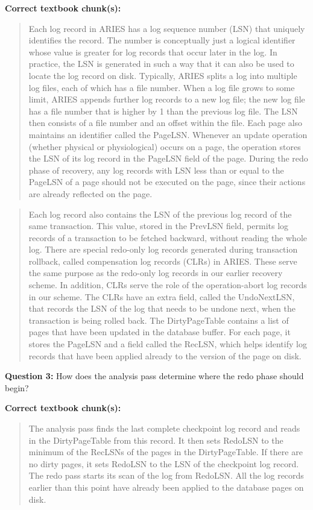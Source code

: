 \documentclass[10pt,twocolumn]{article}
\begin{document}
\textbf{Correct textbook chunk(s):}
\begin{quote}\small
Each log record in ARIES has a log sequence number (LSN) that uniquely identifies the record. The number is conceptually just a logical identifier whose value is greater for log records that occur later in the log. In practice, the LSN is generated in such a way that it can also be used to locate the log record on disk. Typically, ARIES splits a log into multiple log files, each of which has a file number. When a log file grows to some limit, ARIES appends further log records to a new log file; the new log file has a file number that is higher by 1 than the previous log file. The LSN then consists of a file number and an offset within the file. Each page also maintains an identifier called the PageLSN. Whenever an update operation (whether physical or physiological) occurs on a page, the operation stores the LSN of its log record in the PageLSN field of the page. During the redo phase of recovery, any log records with LSN less than or equal to the PageLSN of a page should not be executed on the page, since their actions are already reflected on the page.
\end{quote}
\begin{quote}\small
Each log record also contains the LSN of the previous log record of the same transaction. This value, stored in the PrevLSN field, permits log records of a transaction to be fetched backward, without reading the whole log. There are special redo-only log records generated during transaction rollback, called compensation log records (CLRs) in ARIES. These serve the same purpose as the redo-only log records in our earlier recovery scheme. In addition, CLRs serve the role of the operation-abort log records in our scheme. The CLRs have an extra field, called the UndoNextLSN, that records the LSN of the log that needs to be undone next, when the transaction is being rolled back. The DirtyPageTable contains a list of pages that have been updated in the database buffer. For each page, it stores the PageLSN and a field called the RecLSN, which helps identify log records that have been applied already to the version of the page on disk.
\end{quote}

\textbf{Question 3:} How does the analysis pass determine where the redo phase should begin?

\textbf{Correct textbook chunk(s):}
\begin{quote}\small
The analysis pass finds the last complete checkpoint log record and reads in the DirtyPageTable from this record. It then sets RedoLSN to the minimum of the RecLSNs of the pages in the DirtyPageTable. If there are no dirty pages, it sets RedoLSN to the LSN of the checkpoint log record. The redo pass starts its scan of the log from RedoLSN. All the log records earlier than this point have already been applied to the database pages on disk.
\end{quote}
\end{document}
